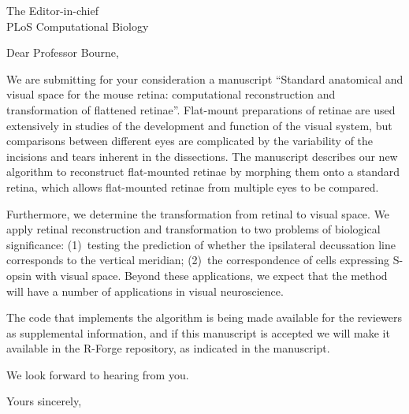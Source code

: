 \documentclass[IANC,11pt]{infletr}
\begin{document}
\begin{letter}{The Editor-in-chief\\
    PLoS Computational Biology
}

\opening{Dear Professor Bourne,}

We are submitting for your consideration a manuscript ``Standard
anatomical and visual space for the mouse retina: computational
reconstruction and transformation of flattened retinae''. Flat-mount
preparations of retinae are used extensively in studies of the
development and function of the visual system, but comparisons between
different eyes are complicated by the variability of the incisions and
tears inherent in the dissections. The manuscript describes our new
algorithm to reconstruct flat-mounted retinae by morphing them onto a
standard retina, which allows flat-mounted retinae from multiple eyes
to be compared.

Furthermore, we determine the transformation from retinal to visual
space. We apply retinal reconstruction and transformation to two
problems of biological significance: (1)~testing the prediction of
whether the ipsilateral decussation line corresponds to the vertical
meridian; (2)~the correspondence of cells expressing S-opsin with
visual space. Beyond these applications, we expect that the method
will have a number of applications in visual neuroscience.

The code that implements the algorithm is being made available for the
reviewers as supplemental information, and if this manuscript is
accepted we will make it available in the R-Forge repository, as
indicated in the manuscript.

We look forward to hearing from you.

\closing{Yours sincerely,}

\end{letter}
\end{document}
